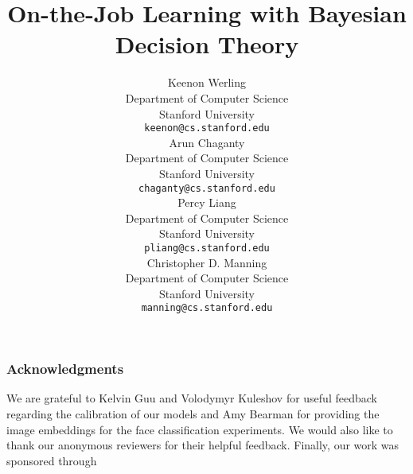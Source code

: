 \documentclass{article} %
\title{On-the-Job Learning with Bayesian Decision Theory}
\author{%
Keenon Werling\\
Department of Computer Science\\
Stanford University\\
\texttt{keenon@cs.stanford.edu} \\
\And{}
Arun Chaganty\\
Department of Computer Science\\
Stanford University\\
\texttt{chaganty@cs.stanford.edu} \\
\And{}
Percy Liang\\
Department of Computer Science\\
Stanford University\\
\texttt{pliang@cs.stanford.edu} \\
\And{}
Christopher D. Manning\\
Department of Computer Science\\
Stanford University\\
\texttt{manning@cs.stanford.edu} \\
}
\begin{document}
\usetikzlibrary{positioning}

\maketitle



%
%



%

%
%




\subsubsection*{Acknowledgments}

We are grateful to Kelvin Guu and Volodymyr Kuleshov for useful feedback regarding the calibration of our models and Amy Bearman for providing the image embeddings for the face classification experiments.
We would also like to thank our anonymous reviewers for their helpful feedback.
Finally, our work was sponsored through 

\small


\end{document}
